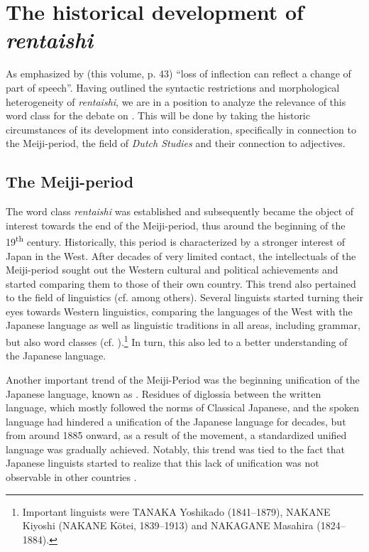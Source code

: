 \documentclass[output=paper,colorlinks,citecolor=brown]{langscibook}
\begin{document}
\section{The historical development of \emph{rentaishi}} \label{12sec4}

As emphasized by \citeauthor{corbett2025} (this volume, p. 43) ``loss of inflection can reflect a change of part of speech''. Having outlined the syntactic restrictions and morphological heterogeneity of \emph{rentaishi}, we are in a position to analyze the relevance of this word class for the debate on . This will be done by taking the historic circumstances of its development into consideration, specifically in connection to the Meiji-period, the field of \emph{Dutch Studies} and their connection to adjectives.

\subsection{The Meiji-period} \label{12sec4.1}

The word class \emph{rentaishi} was established and subsequently became the object of interest towards the end of the Meiji-period, thus around the beginning of the 19\textsuperscript{th} century. Historically, this period is characterized by a stronger interest of Japan in the West.
After decades of very limited contact, the intellectuals of the Meiji-period sought out the Western cultural and political achievements and started comparing them to those of their own country. This trend also pertained to the field of linguistics (cf. \citealt{heinrich2002} among others). Several linguists started turning their eyes towards Western linguistics, comparing the languages of the West with the Japanese language as well as linguistic traditions in all areas, including grammar, but also word classes (cf. \citealt[47--54]{sugimoto1991}).\footnote{Important linguists were TANAKA Yoshikado (1841--1879), NAKANE Kiyoshi (NAKANE Kōtei, 1839--1913) and NAKAGANE Masahira (1824--1884).} In turn, this also led to a better understanding of the Japanese language.

Another important trend of the Meiji-Period was the beginning unification of the Japanese language, known as \emph{}. Residues of diglossia between the written language, which mostly followed the norms of Classical Japanese, and the spoken language had hindered a unification of the Japanese language for decades, but from around 1885 onward, as a result of the \emph{} movement, a standardized unified language was gradually achieved. Notably, this trend was tied to the fact that Japanese linguists started to realize that this lack of unification was not observable in other countries \citep{gottlieb1991}.
\end{document}
